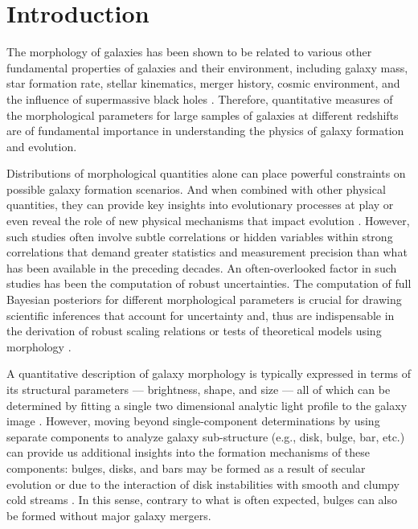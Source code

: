 \section{Introduction} \label{sec_c3:intro}

The morphology of galaxies has been shown to be related to various other fundamental properties of galaxies and their environment, including galaxy mass, star formation rate, stellar kinematics, merger history, cosmic environment, and the influence of supermassive black holes \citep[e.g.,][]{Bender1992DynamicallyProperties,Tremaine2002TheCorrelation,pozzetti_10, wuyts_11, Huertas-Company2016MassCANDELS,powell_17, shimakawa_2021, Dimauro2022CoincidenceGrowth}. Therefore, quantitative measures of the morphological parameters for large samples of galaxies at different redshifts are of fundamental importance in understanding the physics of galaxy formation and evolution. 

Distributions of morphological quantities alone can place powerful constraints on possible galaxy formation scenarios. And when combined with other physical quantities, they can provide key insights into evolutionary processes at play or even reveal the role of new physical  mechanisms that impact evolution \citep[e.g.,][]{Kauffmann2004TheGalaxies,Weinmann2006PropertiesMass,Schawinski2007TheGalaxies,vanderWel2008TheMass,Schawinski2014TheGalaxies}. However, such studies often involve subtle correlations or hidden variables within strong correlations that demand greater statistics and measurement precision than what has been available in the preceding decades. %
An often-overlooked factor in such studies has been the computation of robust uncertainties. The computation of full Bayesian posteriors for different morphological parameters is crucial for drawing scientific inferences that account for uncertainty and, thus are indispensable in 
the derivation of robust scaling relations  \citep[e.g.,][]{Bernardi2013TheProfile, vanderWel20143D-HST+CANDELS:3} or tests of theoretical models using morphology \citep[e.g.,][]{Schawinski2014TheGalaxies}.

A quantitative description of galaxy morphology is typically expressed in terms of its structural parameters --- brightness, shape, and size --- all of which can be determined by fitting a single two dimensional analytic light profile to the galaxy image \citep[e.g.,][]{vdw_12,tarsitano_18}. However, moving beyond single-component determinations by using separate components to analyze galaxy sub-structure (e.g., disk, bulge, bar, etc.) can provide us additional insights into the formation mechanisms of these components: bulges, disks, and bars may be formed as a result of secular evolution \citep[e.g.,][]{kormendy_1979,kormendy_2004, genzel_2008, sellwood_2014} or due to the interaction of disk instabilities with smooth and clumpy cold streams \citep[e.g.,][]{dekel_09a,dekel_09b}. In this sense, contrary to what is often expected, bulges can also be formed without major galaxy mergers. 

